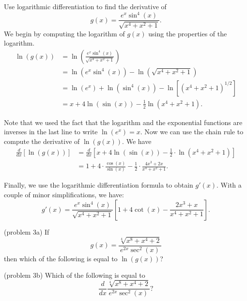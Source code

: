 \documentclass{ximera}
\begin{document}
\begin{example}[example 3]
Use logarithmic differentiation to find the derivative of 
\[
g(x) = \frac{e^x \sin^4(x)}{\sqrt{x^4 + x^2 + 1}}.
\]
We begin by computing the logarithm of $g(x)$ using the properties of the logarithm.
\begin{align*}
\ln(g(x)) &= \ln\left(\frac{e^x \sin^4(x)}{\sqrt{x^4 + x^2 + 1}}\right)\\
&= \ln\left(e^x \sin^4(x)\right) - \ln\left(\sqrt{x^4 + x^2 + 1}\right)\\
&= \ln(e^x) + \ln(\sin^4(x)) - \ln[(x^4 + x^2 + 1)^{1/2}]\\
&= x + 4\ln(\sin(x)) - \frac12 \ln(x^4 + x^2 + 1).
\end{align*}

Note that we used the fact that the logarithm and the exponential functions are 
inverses in the last line
to write $\ln(e^x) = x$.
Now we can use the chain rule to compute the derivative of $\ln(g(x))$.
We have
\begin{align*}
\frac{d}{dx}\left[ \ln(g(x))\right] &= \frac{d}{dx}\left[ x + 4\ln(\sin(x)) - \frac12 \cdot \ln(x^4 + x^2 + 1)\right]\\
&= 1+ 4 \cdot \frac{\cos(x)}{\sin(x)} - \frac12 \cdot \frac{4x^3 + 2x}{x^4 + x^2 + 1}.
\end{align*}


Finally, we use the logarithmic differentiation formula to obtain $g'(x)$.
With a couple of minor simplifications, we have:
\[
g'(x) = \frac{e^x \sin^4(x)}{\sqrt{x^4 + x^2 + 1}} \left[1+ 4 \cot(x) - 
 \frac{2x^3 + x}{x^4 + x^2 + 1}\right].
\]

\end{example}

\begin{problem}(problem 3a)
  If 
	\[
	g(x) = \frac{\sqrt[4]{x^8 + x^4 + 2}}{e^{2x} \sec^2(x)}
	\]
	then which of the following is equal to $\ln(g(x))$?
  \begin{multipleChoice}
  \end{multipleChoice}
\end{problem}



\begin{problem}(problem 3b)
  Which of the following is equal to 
  \[
  \frac{d}{dx} \frac{\sqrt[4]{x^8 + x^4 + 2}}{e^{2x} \sec^2(x)}?
  \]

  \begin{multipleChoice}
  \end{multipleChoice}
   
		
\end{problem}
\end{document}
